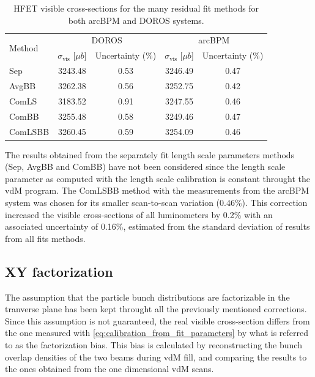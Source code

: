 \begin{table}[!htb]
    \centering
    \caption{HFET visible cross-sections for the many residual fit methods for both arcBPM and DOROS systems.}
    \label{tb:hfet_rod_xsec}
    \begin{tabular}{lcc|cc}
        \hline
        \multirow{2}{*}{Method} & \multicolumn{2}{c|}{DOROS} & \multicolumn{2}{c}{arcBPM} \\
        \cline{2-5}
         & $\sigma_{\mathrm{vis}}$ [$\mu b$] & Uncertainty (\%) & $\sigma_{\mathrm{vis}}$ [$\mu b$] & Uncertainty (\%) \\
        \hline
        Sep     & 3243.48 & 0.53 & 3246.49 & 0.47 \\
        AvgBB   & 3262.38 & 0.56 & 3252.75 & 0.42 \\
        ComLS   & 3183.52 & 0.91 & 3247.55 & 0.46 \\
        ComBB   & 3255.48 & 0.58 & 3249.46 & 0.47 \\
        ComLSBB & 3260.45 & 0.59 & 3254.09 & 0.46 \\
        \hline
    \end{tabular}
\end{table}


The results obtained from the separately fit length scale parameters methods (Sep, AvgBB and ComBB) have not been considered since the length scale parameter as computed with the length scale calibration is constant throught the vdM program. The ComLSBB method with the measurements from the arcBPM system was chosen for its smaller scan-to-scan variation (0.46\%). This correction increased the visible cross-sections of all luminometers by 0.2\% with an associated uncertainty of 0.16\%, estimated from the standard deviation of results from all fits methods.

\subsection{XY factorization}

The assumption that the particle bunch distributions are factorizable in the tranverse plane has been kept throught all the previously mentioned corrections. Since this assumption is not guaranteed, the real visible cross-section differs from the one measured with \autoref{eq:calibration_from_fit_parameters} by what is referred to as the factorization bias. This bias is calculated by reconstructing the bunch overlap densities of the two beams during vdM fill, and comparing the results to the ones obtained from the one dimensional vdM scans.

